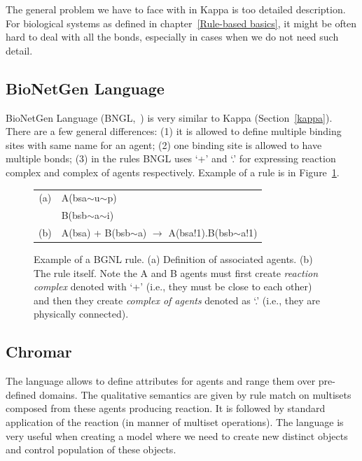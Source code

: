 \documentclass[12pt]{fithesis2}
\begin{document}
The general problem we have to face with in Kappa is too detailed description. For biological systems as defined in chapter~\ref{Rule-based basics}, it might be often hard to deal with all the bonds, especially in cases when we do not need such detail.

\subsection{BioNetGen Language}
\label{bngl}

BioNetGen Language (BNGL,~\cite{BNGL}) is very similar to Kappa (Section~\ref{kappa}). There are a few general differences: (1) it is allowed to define multiple binding sites with same name for an agent; (2) one binding site is allowed to have multiple bonds; (3) in the rules BNGL uses `+' and `.' for expressing reaction complex and complex of agents respectively. Example of a rule is in Figure~\ref{bngl-rule}.

\begin{figure}[!h]
\begin{center}
\begin{tabular}{c l}
(a) & A(bsa$\sim$u$\sim$p) \\
  & B(bsb$\sim$a$\sim$i) \\
(b) & A(bsa) + B(bsb$\sim$a) $\rightarrow$ A(bsa!1).B(bsb$\sim$a!1) \\
\end{tabular}
\end{center}
\caption{Example of a BGNL rule. (a) Definition of associated agents. (b) The rule itself. Note the A and B agents must first create \emph{reaction complex} denoted with `+' (i.e., they must be close to each other) and then they create \emph{complex of agents} denoted as `.' (i.e., they are physically connected).}\label{bngl-rule}
\end{figure}

\subsection{Chromar}

The language allows to define attributes for agents and range them over pre-defined domains. The qualitative semantics are given by rule match on multisets composed from these agents producing reaction. It is followed by standard application of the reaction (in manner of multiset operations). The language is very useful when creating a model where we need to create new distinct objects and control population of these objects.
\end{document}
